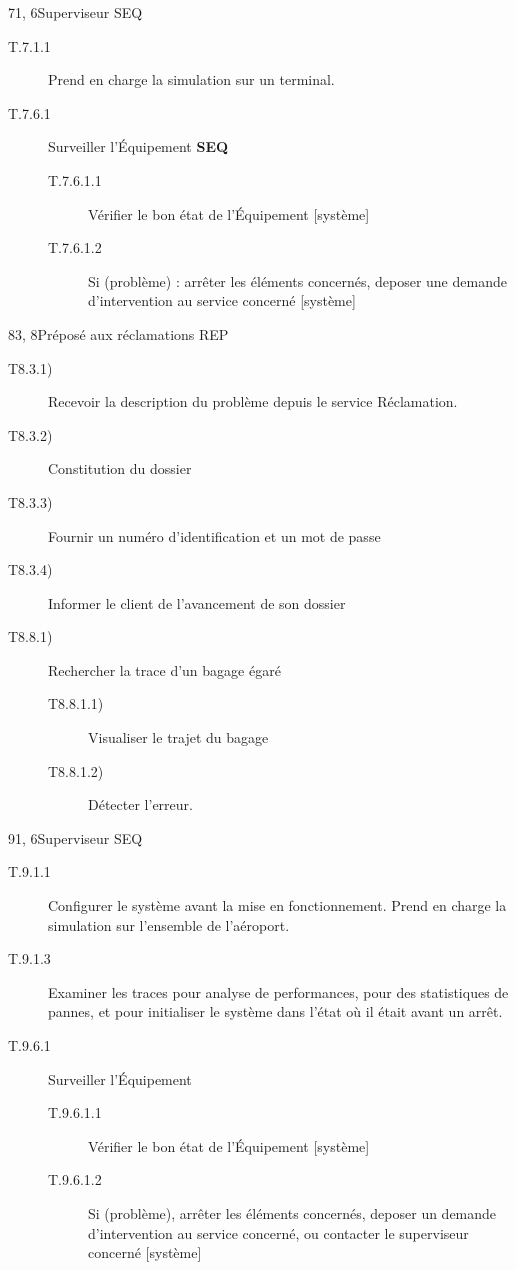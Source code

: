 \dta
{7}{1, 6}{Superviseur}
{SEQ}
{
\begin{description}
	\item[T.7.1.1] Prend en charge la simulation sur un terminal.
	
	\item[T.7.6.1] Surveiller l'Équipement \textbf{SEQ}
	\begin{description}
		\item[T.7.6.1.1] Vérifier le bon état de l'Équipement [système]
		\item[T.7.6.1.2] Si (problème) : arrêter les éléments concernés, deposer une demande d'intervention au service concerné [système]
	\end{description}
\end{description}
}

\dta
{8}{3, 8}{Préposé aux réclamations}
{REP}
{
\begin{description}
	\item [T8.3.1)] Recevoir la description du problème depuis le service \og Réclamation\fg.
	\item [T8.3.2)] Constitution du dossier 
	\item [T8.3.3)] Fournir un numéro d'identification et un mot de passe
	\item [T8.3.4)] Informer le client de l'avancement de son dossier

	\item [T8.8.1)] Rechercher la trace d'un bagage égaré
	\begin{description}
		\item [T8.8.1.1)] Visualiser le trajet du bagage
		\item [T8.8.1.2)] Détecter l'erreur.
	\end{description}
\end{description}
}

\dta
{9}{1, 6}{Superviseur}
{SEQ}
{
\begin{description}
	\item[T.9.1.1] Configurer le système avant la mise en fonctionnement.
	\itme[T.9.1.2] Prend en charge la simulation sur l'ensemble de l'aéroport.
	\item[T.9.1.3] Examiner les traces pour analyse de performances, pour des statistiques de pannes, et pour initialiser le système dans l'état où il était avant un arrêt.

	\item[T.9.6.1] Surveiller l'Équipement
	\begin{description}
		\item[T.9.6.1.1] Vérifier le bon état de l'Équipement [système]
		\item[T.9.6.1.2] Si (problème), arrêter les éléments concernés, deposer un
		demande d'intervention au service concerné, ou contacter le superviseur concerné [système]
	\end{description}
\end{description}
}
